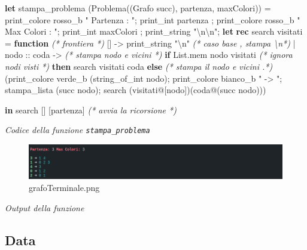 \documentclass[11pt]{article}
\newenvironment{Shaded}{}{}
\newcommand{\KeywordTok}[1]{\textcolor[rgb]{0.00,0.44,0.13}{\textbf{{#1}}}}
\newcommand{\DataTypeTok}[1]{\textcolor[rgb]{0.56,0.13,0.00}{{#1}}}
\newcommand{\CharTok}[1]{\textcolor[rgb]{0.25,0.44,0.63}{{#1}}}
\newcommand{\StringTok}[1]{\textcolor[rgb]{0.25,0.44,0.63}{{#1}}}
\newcommand{\CommentTok}[1]{\textcolor[rgb]{0.38,0.63,0.69}{\textit{{#1}}}}
\newcommand{\NormalTok}[1]{{#1}}
\begin{document}
\begin{Shaded}
\begin{Highlighting}[]
\KeywordTok{let}\NormalTok{ stampa\_problema (Problema((Grafo }\DataTypeTok{succ}\NormalTok{), partenza, maxColori)) =}
\NormalTok{    print\_colore rosso\_b }\StringTok{" Partenza : "}\NormalTok{;}
    \DataTypeTok{print\_int}\NormalTok{ partenza ; print\_colore rosso\_b }\StringTok{" Max Colori : "}\NormalTok{;}
    \DataTypeTok{print\_int}\NormalTok{ maxColori ; }\DataTypeTok{print\_string} \StringTok{"}\CharTok{\textbackslash{}n\textbackslash{}n}\StringTok{"}\NormalTok{;}
    \KeywordTok{let} \KeywordTok{rec}\NormalTok{ search visitati = }\KeywordTok{function} \CommentTok{(* frontiera *)}
\NormalTok{        [] {-}\textgreater{} }\DataTypeTok{print\_string} \StringTok{"}\CharTok{\textbackslash{}n}\StringTok{"} \CommentTok{(* caso base , stampa \textbackslash{}n*)}
\NormalTok{      | nodo :: coda {-}\textgreater{} }\CommentTok{(* stampa nodo e vicini *)}
        \KeywordTok{if} \DataTypeTok{List}\NormalTok{.mem nodo visitati }\CommentTok{(* ignora nodi visti *)}
            \KeywordTok{then}
\NormalTok{                search visitati coda}
        \KeywordTok{else} \CommentTok{(* stampa il nodo e vicini .*)}
\NormalTok{           (print\_colore verde\_b (}\DataTypeTok{string\_of\_int}\NormalTok{ nodo);}
\NormalTok{            print\_colore bianco\_b }\StringTok{" {-}\textgreater{} "}\NormalTok{;}
\NormalTok{            stampa\_lista (}\DataTypeTok{succ}\NormalTok{ nodo);}
\NormalTok{            search (visitati@[nodo])(coda@(}\DataTypeTok{succ}\NormalTok{ nodo)))}

    \KeywordTok{in}\NormalTok{ search [] [partenza] }\CommentTok{(* avvia la ricorsione *)}
\end{Highlighting}
\end{Shaded}

\emph{Codice della funzione \texttt{stampa\_problema}}

    \begin{figure}
\centering
\includegraphics{Colored Camel_files/grafoterminale.png}
\caption{grafoTerminale.png}
\end{figure}

\emph{Output della funzione}

    \hypertarget{data}{%
\subsection{\texorpdfstring{Data }{Data }}\label{data}}
\end{document}
